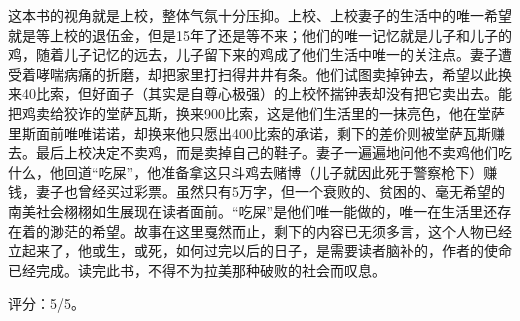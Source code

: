 这本书的视角就是上校，整体气氛十分压抑。上校、上校妻子的生活中的唯一希望就是等上校的退伍金，但是15年了还是等不来；他们的唯一记忆就是儿子和儿子的鸡，随着儿子记忆的远去，儿子留下来的鸡成了他们生活中唯一的关注点。妻子遭受着哮喘病痛的折磨，却把家里打扫得井井有条。他们试图卖掉钟去，希望以此换来40比索，但好面子（其实是自尊心极强）的上校怀揣钟表却没有把它卖出去。能把鸡卖给狡诈的堂萨瓦斯，换来900比索，这是他们生活里的一抹亮色，他在堂萨里斯面前唯唯诺诺，却换来他只愿出400比索的承诺，剩下的差价则被堂萨瓦斯赚去。最后上校决定不卖鸡，而是卖掉自己的鞋子。妻子一遍遍地问他不卖鸡他们吃什么，他回道“吃屎”，他准备拿这只斗鸡去赌博（儿子就因此死于警察枪下）赚钱，妻子也曾经买过彩票。虽然只有5万字，但一个衰败的、贫困的、毫无希望的南美社会栩栩如生展现在读者面前。“吃屎”是他们唯一能做的，唯一在生活里还存在着的渺茫的希望。故事在这里戛然而止，剩下的内容已无须多言，这个人物已经立起来了，他或生，或死，如何过完以后的日子，是需要读者脑补的，作者的使命已经完成。读完此书，不得不为拉美那种破败的社会而叹息。

评分：5/5。